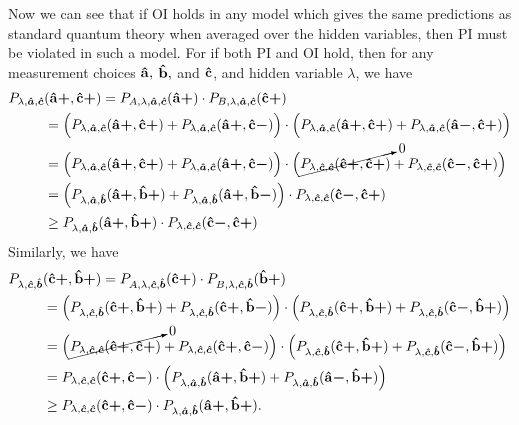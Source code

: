 Now we can see that if OI holds in any model which gives the same predictions as standard quantum theory when averaged over the hidden variables, then PI must be violated in such a model. For if both PI and OI hold, then for any measurement choices $\vb{\hat{a}},$ $\vb{\hat{b}},$ and $\vb{\hat{c}}$, and hidden variable $\lambda$, we have
\begin{equation}\label{OIPI1}
\begin{split}
 P_{\lambda,\bm{\hat{a}},\bm{\hat{c}}}&(\vb{\hat{{a}}}\bm{+},\vb{\hat{{c}}}\bm{+})=P_{A,\lambda,\bm{\hat{a}},\bm{\hat{c}}}(\vb{\hat{{a}}}\bm{+})\cdot P_{B,\lambda,\bm{\hat{a}},\bm{\hat{c}}}(\vb{\hat{{c}}}\bm{+})\\
 &= \Big( P_{\lambda,\bm{\hat{a}},\bm{\hat{c}}}(\vb{\hat{{a}}}\bm{+},\vb{\hat{{c}}}\bm{+})+ P_{\lambda,\bm{\hat{a}},\bm{\hat{c}}}(\vb{\hat{{a}}}\bm{+},\vb{\hat{{c}}}\bm{-})\Big)\cdot\Big( P_{\lambda,\bm{\hat{a}},\bm{\hat{c}}}(\vb{\hat{{a}}}\bm{+},\vb{\hat{{c}}}\bm{+})+ P_{\lambda,\bm{\hat{a}},\bm{\hat{c}}}(\vb{\hat{{a}}}\bm{-},\vb{\hat{{c}}}\bm{+})\Big)\\
 &= \Big( P_{\lambda,\bm{\hat{a}},\bm{\hat{c}}}(\vb{\hat{{a}}}\bm{+},\vb{\hat{{c}}}\bm{+})+ P_{\lambda,\bm{\hat{a}},\bm{\hat{c}}}(\vb{\hat{{a}}}\bm{+},\vb{\hat{{c}}}\bm{-})\Big)\cdot\Big( \cancelto{0}{P_{\lambda,\bm{\hat{c}},\bm{\hat{c}}}(\vb{\hat{{c}}}\bm{+},\vb{\hat{{c}}}\bm{+})}+ P_{\lambda,\bm{\hat{c}},\bm{\hat{c}}}(\vb{\hat{{c}}}\bm{-},\vb{\hat{{c}}}\bm{+})\Big)\\
 &=\Big( P_{\lambda,\bm{\hat{a}},\bm{\hat{b}}}(\vb{\hat{{a}}}\bm{+},\vb{\hat{{b}}}\bm{+})+ P_{\lambda,\bm{\hat{a}},\bm{\hat{b}}}(\vb{\hat{{a}}}\bm{+},\vb{\hat{{b}}}\bm{-})\Big)\cdot P_{\lambda,\bm{\hat{c}},\bm{\hat{c}}}(\vb{\hat{{c}}}\bm{-},\vb{\hat{{c}}}\bm{+})\\
 &\geq P_{\lambda,\bm{\hat{a}},\bm{\hat{b}}}(\vb{\hat{{a}}}\bm{+},\vb{\hat{{b}}}\bm{+})\cdot P_{\lambda,\bm{\hat{c}},\bm{\hat{c}}}(\vb{\hat{{c}}}\bm{-},\vb{\hat{{c}}}\bm{+}) 
\end{split}
\end{equation}
Similarly, we have
\begin{equation}\label{OIPI2}
\begin{split}
 P_{\lambda,\bm{\hat{c}},\bm{\hat{b}}}&(\vb{\hat{{c}}}\bm{+},\vb{\hat{{b}}}\bm{+})=P_{A,\lambda,\bm{\hat{c}},\bm{\hat{b}}}(\vb{\hat{{c}}}\bm{+})\cdot P_{B,\lambda,\bm{\hat{c}},\bm{\hat{b}}}(\vb{\hat{{b}}}\bm{+})\\
 &= \Big( P_{\lambda,\bm{\hat{c}},\bm{\hat{b}}}(\vb{\hat{{c}}}\bm{+},\vb{\hat{{b}}}\bm{+})+ P_{\lambda,\bm{\hat{c}},\bm{\hat{b}}}(\vb{\hat{{c}}}\bm{+},\vb{\hat{{b}}}\bm{-})\Big)\cdot\Big( P_{\lambda,\bm{\hat{c}},\bm{\hat{b}}}(\vb{\hat{{c}}}\bm{+},\vb{\hat{{b}}}\bm{+})+ P_{\lambda,\bm{\hat{c}},\bm{\hat{b}}}(\vb{\hat{{c}}}\bm{-},\vb{\hat{{b}}}\bm{+})\Big)\\
 &= \Big(  \cancelto{0}{P_{\lambda,\bm{\hat{c}},\bm{\hat{c}}}(\vb{\hat{{c}}}\bm{+},\vb{\hat{{c}}}\bm{+})}+ P_{\lambda,\bm{\hat{c}},\bm{\hat{c}}}(\vb{\hat{{c}}}\bm{+},\vb{\hat{{c}}}\bm{-})\Big)\cdot\Big(P_{\lambda,\bm{\hat{c}},\bm{\hat{b}}}(\vb{\hat{{c}}}\bm{+},\vb{\hat{{b}}}\bm{+})+ P_{\lambda,\bm{\hat{c}},\bm{\hat{b}}}(\vb{\hat{{c}}}\bm{-},\vb{\hat{{b}}}\bm{+})\Big)\\
 &=P_{\lambda,\bm{\hat{c}},\bm{\hat{c}}}(\vb{\hat{{c}}}\bm{+},\vb{\hat{{c}}}\bm{-})\cdot\Big( P_{\lambda,\bm{\hat{a}},\bm{\hat{b}}}(\vb{\hat{{a}}}\bm{+},\vb{\hat{{b}}}\bm{+})+ P_{\lambda,\bm{\hat{a}},\bm{\hat{b}}}(\vb{\hat{{a}}}\bm{-},\vb{\hat{{b}}}\bm{+})\Big)\\
 &\geq P_{\lambda,\bm{\hat{c}},\bm{\hat{c}}}(\vb{\hat{{c}}}\bm{+},\vb{\hat{{c}}}\bm{-})\cdot P_{\lambda,\bm{\hat{a}},\bm{\hat{b}}}(\vb{\hat{{a}}}\bm{+},\vb{\hat{{b}}}\bm{+}) .
\end{split}
\end{equation}
